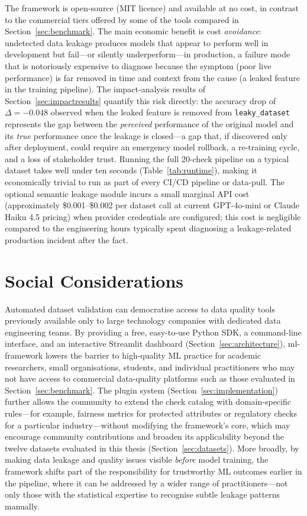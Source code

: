 \documentclass[12pt,a4paper]{report}
\begin{document}
The framework is open-source (MIT licence) and available at no cost, in contrast to the
commercial tiers offered by some of the tools compared in Section~\ref{sec:benchmark}.  The
main economic benefit is cost \emph{avoidance}: undetected data leakage produces models that
appear to perform well in development but fail---or silently underperform---in production,
a failure mode that is notoriously expensive to diagnose because the symptom (poor live
performance) is far removed in time and context from the cause (a leaked feature in the
training pipeline).  The impact-analysis results of Section~\ref{sec:impactresults} quantify
this risk directly: the accuracy drop of $\Delta{=}{-}0.048$ observed when the leaked feature
is removed from \texttt{leaky\_dataset} represents the gap between the \emph{perceived}
performance of the original model and its \emph{true} performance once the leakage is
closed---a gap that, if discovered only after deployment, could require an emergency model
rollback, a re-training cycle, and a loss of stakeholder trust.  Running the full 20-check
pipeline on a typical dataset takes well under ten seconds (Table~\ref{tab:runtime}), making
it economically trivial to run as part of every CI/CD pipeline or data-pull.  The optional
semantic leakage module incurs a small marginal API cost (approximately \$0.001--\$0.002 per
dataset call at current GPT-4o-mini or Claude Haiku 4.5 pricing) when provider credentials
are configured; this cost
is negligible compared to the engineering hours typically spent diagnosing a leakage-related
production incident after the fact.

\section{Social Considerations}

Automated dataset validation can democratise access to data quality tools previously
available only to large technology companies with dedicated data engineering teams.  By
providing a free, easy-to-use Python SDK, a command-line interface, and an interactive
Streamlit dashboard (Section~\ref{sec:architecture}), ml-framework lowers the barrier to
high-quality ML practice for academic researchers, small organisations, students, and
individual practitioners who may not have access to commercial data-quality platforms such
as those evaluated in Section~\ref{sec:benchmark}.  The plugin system
(Section~\ref{sec:implementation}) further allows the community to extend the check catalog
with domain-specific rules---for example, fairness metrics for protected attributes or
regulatory checks for a particular industry---without modifying the framework's core, which
may encourage community contributions and broaden its applicability beyond the twelve
datasets evaluated in this thesis (Section~\ref{sec:datasets}).  More broadly, by making
data leakage and quality issues visible \emph{before} model training, the framework shifts
part of the responsibility for trustworthy ML outcomes earlier in the pipeline, where it can
be addressed by a wider range of practitioners---not only those with the statistical
expertise to recognise subtle leakage patterns manually.
\end{document}
